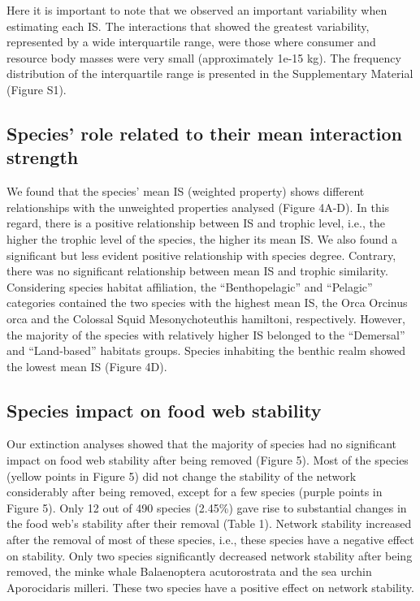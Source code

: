 \documentclass[gc, manuscript]{copernicus}
\begin{document}
Here it is important to note that we observed an important variability
when estimating each IS. The interactions that showed the greatest
variability, represented by a wide interquartile range, were those where
consumer and resource body masses were very small (approximately 1e-15
kg). The frequency distribution of the interquartile range is presented
in the Supplementary Material (Figure S1).

\subsection{Species' role related to their mean interaction strength}

We found that the species' mean IS (weighted property) shows different
relationships with the unweighted properties analysed (Figure 4A-D). In
this regard, there is a positive relationship between IS and trophic
level, i.e., the higher the trophic level of the species, the higher its
mean IS. We also found a significant but less evident positive
relationship with species degree. Contrary, there was no significant
relationship between mean IS and trophic similarity. Considering species
habitat affiliation, the ``Benthopelagic'' and ``Pelagic'' categories
contained the two species with the highest mean IS, the Orca Orcinus
orca and the Colossal Squid Mesonychoteuthis hamiltoni, respectively.
However, the majority of the species with relatively higher IS belonged
to the ``Demersal'' and ``Land-based'' habitats groups. Species
inhabiting the benthic realm showed the lowest mean IS (Figure 4D).

\subsection{Species impact on food web stability}

Our extinction analyses showed that the majority of species had no
significant impact on food web stability after being removed (Figure 5).
Most of the species (yellow points in Figure 5) did not change the
stability of the network considerably after being removed, except for a
few species (purple points in Figure 5). Only 12 out of 490 species
(2.45\%) gave rise to substantial changes in the food web's stability
after their removal (Table 1). Network stability increased after the
removal of most of these species, i.e., these species have a negative
effect on stability. Only two species significantly decreased network
stability after being removed, the minke whale Balaenoptera
acutorostrata and the sea urchin Aporocidaris milleri. These two species
have a positive effect on network stability.
\end{document}
